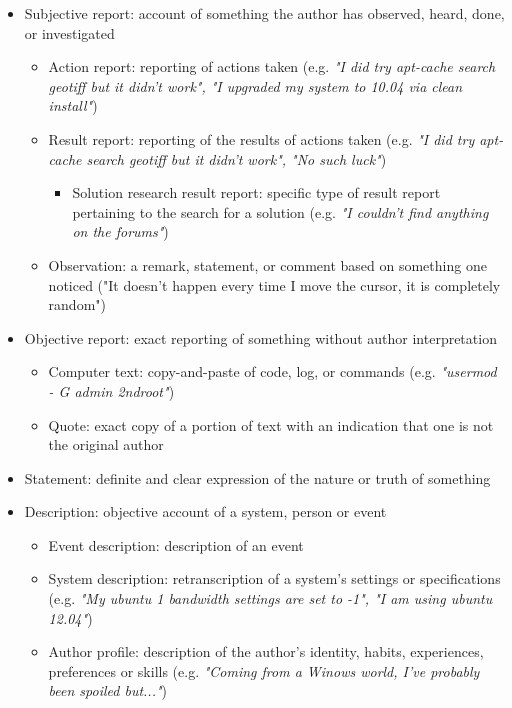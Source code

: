 \documentclass[11pt]{article}
\begin{document}
\begin{itemize}
	\item Subjective report: account of something the author has observed, heard, done, or investigated
		\begin{itemize}
			\item Action report: reporting of actions taken (e.g. \textit{"I did try apt-cache search geotiff but it didn't work", "I upgraded my system to 10.04 via clean install"})
			\item Result report: reporting of the results of actions taken (e.g. \textit{"I did try apt-cache search geotiff but it didn't work", "No such luck"})
				\begin{itemize}
					\item Solution research result report: specific type of result report pertaining to the search for a solution (e.g. \textit{"I couldn't find anything on the forums"})
				\end{itemize}
			\item Observation: a remark, statement, or comment based on something one noticed ("It doesn't happen every time I move the cursor, it is completely random")
		\end{itemize}
	\item Objective report: exact reporting of something without author interpretation
		\begin{itemize}
			\item Computer text: copy-and-paste of code, log, or commands (e.g. \textit{"usermod - G admin 2ndroot"})
			\item Quote: exact copy of a portion of text with an indication that one is not the original author
		\end{itemize}
	\item Statement: definite and clear expression of the nature or truth of something
	\item Description: objective account of a system, person or event
		\begin{itemize}
			\item Event description: description of an event
			\item System description: retranscription of a system's settings or specifications (e.g. \textit{"My ubuntu 1 bandwidth settings are set to -1", "I am using ubuntu 12.04"})
			\item Author profile: description of the author's identity, habits, experiences, preferences or skills (e.g. \textit{"Coming from a Winows world, I've probably been spoiled but..."})

\end{itemize}
\end{itemize}
\end{document}
